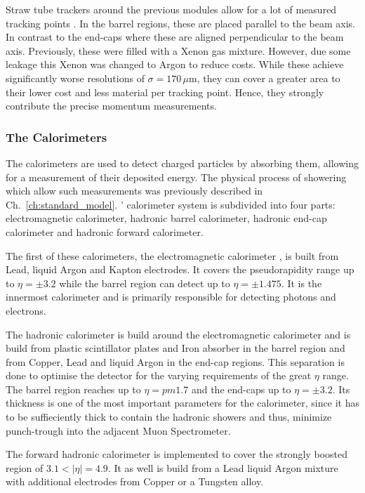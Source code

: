 \documentclass[bachelor,ngerman,english]{GAUBM}
\begin{document}
Straw tube trackers around the previous modules allow for a lot of measured tracking points \cite{atlas:tech_design_report_01,atlas:transition_detector}. In the barrel regions, these are placed parallel to the beam axis. In contrast to the end-caps where these are aligned perpendicular to the beam axis. Previously, these were filled with a Xenon gas mixture. However, due some leakage this Xenon was changed to Argon to reduce costs. While these achieve significantly worse resolutions of $\sigma=170\,\mu\text{m}$, they can cover a greater area to their lower cost and less material per tracking point. Hence, they strongly contribute the precise momentum measurements.

\subsubsection*{The Calorimeters}
The calorimeters \cite{atlas:tech_design_report_01,atlas:calorimeter} are used to detect charged particles by absorbing them, allowing for a measurement of their deposited energy. The physical process of showering which allow such measurements was previously described in Ch.~\ref{ch:standard_model}. \atlas' calorimeter system is subdivided into four parts: electromagnetic calorimeter, hadronic barrel calorimeter, hadronic end-cap calorimeter and hadronic forward calorimeter.

The first of these calorimeters, the electromagnetic calorimeter \cite{atlas:tech_design_report_01}, is built from Lead, liquid Argon and Kapton electrodes. It covers the pseudorapidity range up to $\eta=\pm3.2$ while the barrel region can detect up to $\eta=\pm1.475$. It is the innermost calorimeter and is primarily responsible for detecting photons and electrons. 

The hadronic calorimeter \cite{atlas:tech_design_report_01} is build around the electromagnetic calorimeter and is build from plastic scintillator plates and Iron absorber in the barrel region and from Copper, Lead and liquid Argon in the end-cap regions. This separation is done to optimise the detector for the varying requirements of the great $\eta$ range. The barrel region reaches up to $\eta=pm1.7$ and the end-caps up to $\eta=\pm3.2$. Its thickness is one of the most important parameters for the calorimeter, since it has to be suffieciently thick to contain the hadronic showers and thus, minimize punch-trough into the adjacent Muon Spectrometer.

The forward hadronic calorimeter \cite{atlas:tech_design_report_01} is implemented to cover the strongly boosted region of $3.1<|\eta|=4.9$. It as well is build from a Lead liquid Argon mixture with additional electrodes from Copper or a Tungsten alloy.
\end{document}
